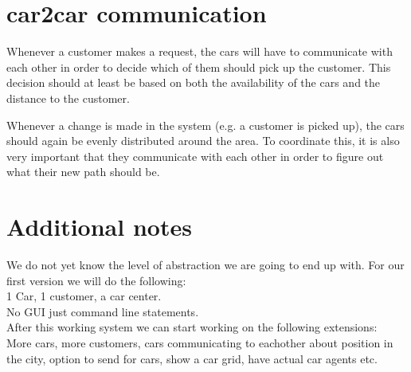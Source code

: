 \documentclass[8pt]{article}
\begin{document}
\section{car2car communication}
Whenever a customer makes a request, the cars will have to communicate with each other in order to decide which of them should pick up the customer. This decision should at least be based on both the availability of the cars and the distance to the customer. 

Whenever a change is made in the system (e.g. a customer is picked up), the cars should again be evenly distributed around the area. To coordinate this, it is also very important that they communicate with each other in order to figure out what their new path should be. 

\section{Additional notes}
We do not yet know the level of abstraction we are going to end up with. For our first version we will do the following:\\
1 Car, 1 customer, a car center. \\
No GUI just command line statements.\\
After this working system we can start working on the following extensions:\\
More cars, more customers, cars communicating to eachother about position in the city, option to send for cars, show a car grid, have actual car agents etc.
\end{document}
